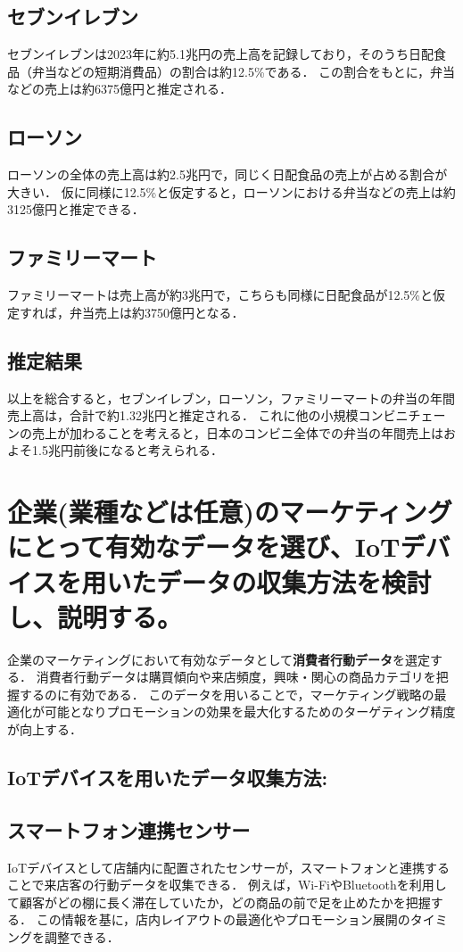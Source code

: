 \documentclass[titlepage,a4paper]{jsarticle}
\begin{document}
\subsection{セブンイレブン}
セブンイレブンは2023年に約5.1兆円の売上高を記録しており，そのうち日配食品（弁当などの短期消費品）の割合は約12.5\%である\cite{711}．
この割合をもとに，弁当などの売上は約6375億円と推定される．

\subsection{ローソン}
ローソンの全体の売上高は約2.5兆円で，同じく日配食品の売上が占める割合が大きい．
仮に同様に12.5\%と仮定すると，ローソンにおける弁当などの売上は約3125億円と推定できる\cite{Lowson}．

\subsection{ファミリーマート}
ファミリーマートは売上高が約3兆円で，こちらも同様に日配食品が12.5\%と仮定すれば，弁当売上は約3750億円となる\cite{fam}．

\subsection{推定結果}
以上を総合すると，セブンイレブン，ローソン，ファミリーマートの弁当の年間売上高は，合計で約1.32兆円と推定される．
これに他の小規模コンビニチェーンの売上が加わることを考えると，日本のコンビニ全体での弁当の年間売上はおよそ1.5兆円前後になると考えられる．

\section{企業(業種などは任意)のマーケティングにとって有効なデータを選び、IoTデバイスを用いたデータの収集方法を検討し、説明する。}
企業のマーケティングにおいて有効なデータとして\textbf{消費者行動データ}を選定する．
消費者行動データは購買傾向や来店頻度，興味・関心の商品カテゴリを把握するのに有効である．
このデータを用いることで，マーケティング戦略の最適化が可能となりプロモーションの効果を最大化するためのターゲティング精度が向上する．

\subsection*{IoTデバイスを用いたデータ収集方法:}
\subsection{スマートフォン連携センサー}
IoTデバイスとして店舗内に配置されたセンサーが，スマートフォンと連携することで来店客の行動データを収集できる．
例えば，Wi-FiやBluetoothを利用して顧客がどの棚に長く滞在していたか，どの商品の前で足を止めたかを把握する．
この情報を基に，店内レイアウトの最適化やプロモーション展開のタイミングを調整できる．
\end{document}
